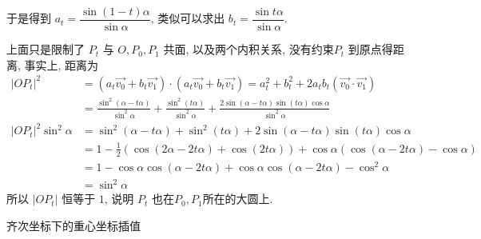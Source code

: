于是得到 $a_t = \dfrac{\sin(1-t)\alpha}{\sin\alpha}$, 类似可以求出 $b_t = \dfrac{\sin t\alpha}{\sin\alpha}$. 

上面只是限制了 $P_t$ 与 $O, P_0, P_1$ 共面, 以及两个内积关系, 没有约束$P_t$ 到原点得距离, 事实上, 距离为
\begin{align*}
|OP_t|^2 &= (a_t \vec{v_0} + b_t \vec{v_1})\cdot(a_t \vec{v_0} + b_t \vec{v_1}) = a_t^2 + b_t^2 + 2a_tb_t(\vec{v_0}\cdot\vec{v_1})\\ 
&= \frac{\sin^2(\alpha - t\alpha)}{\sin^2\alpha} + \frac{\sin^2(t\alpha)}{\sin^2\alpha} + \frac{2\sin(\alpha - t\alpha)\sin(t\alpha)\cos\alpha}{\sin^2\alpha}\\
|OP_t|^2 \sin^2\alpha &= \sin^2(\alpha - t\alpha) + \sin^2(t\alpha) + 2\sin(\alpha - t\alpha)\sin(t\alpha)\cos\alpha\\
&= 1-\frac{1}{2}(\cos(2\alpha - 2t\alpha) + \cos(2t\alpha)) + \cos\alpha(\cos(\alpha - 2t\alpha) - \cos\alpha)\\
&= 1 - \cos\alpha\cos(\alpha - 2t\alpha) + \cos\alpha\cos(\alpha-2t\alpha) - \cos^2\alpha\\
&= \sin^2\alpha
\end{align*}
所以 $|OP_t|$ 恒等于 $1$, 说明 $P_t$ 也在$P_0, P_1$所在的大圆上.

\newpage
\noindent 齐次坐标下的重心坐标插值

